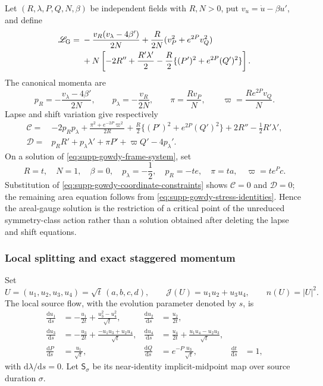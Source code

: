 \documentclass[11pt]{article}
\numberwithin{equation}{section}
\theoremstyle{definition}
\theoremstyle{remark}
\newcommand{\dd}{\mathrm d}
\begin{document}
Let $(R,\lambda,P,Q,N,\beta)$ be independent fields with $R,N>0$, put
$v_u=\dot u-\beta u'$, and define
\begin{align}
 \mathscr L_{\rm G}={}&
 -\frac{v_R(v_\lambda-4\beta')}{2N}
 +\frac R{2N}(v_P^2+e^{2P}v_Q^2)\nonumber\\
 &+N\left[-2R''+\frac{R'\lambda'}2
 -\frac R2\{(P')^2+e^{2P}(Q')^2\}\right].
 \label{eq:supp-gowdy-adm-density}
\end{align}
The canonical momenta are
\begin{equation}
 p_R=-\frac{v_\lambda-4\beta'}{2N},\qquad
 p_\lambda=-\frac{v_R}{2N},\qquad
 \pi=\frac{Rv_P}{N},\qquad
 \varpi=\frac{Re^{2P}v_Q}{N}.
 \label{eq:supp-gowdy-momenta}
\end{equation}
Lapse and shift variation give respectively
\begin{align}
 \mathcal C={}&-2p_Rp_\lambda
 +\frac{\pi^2+e^{-2P}\varpi^2}{2R}
 +\frac R2\{(P')^2+e^{2P}(Q')^2\}
 +2R''-\frac12R'\lambda',\label{eq:supp-gowdy-H}\\
 \mathcal D={}&p_RR'+p_\lambda\lambda'+\pi P'+\varpi Q'-4p_\lambda'.
 \label{eq:supp-gowdy-D}
\end{align}
On a solution of \eqref{eq:supp-gowdy-frame-system}, set
\begin{equation}
 R=t,\quad N=1,\quad\beta=0,\quad
 p_\lambda=-\frac12,\quad p_R=-te,\quad
 \pi=ta,\quad\varpi=te^Pc.
 \label{eq:supp-gowdy-areal-lift}
\end{equation}
Substitution of \eqref{eq:supp-gowdy-coordinate-constraints} shows
$\mathcal C=0$ and $\mathcal D=0$; the remaining area equation follows from
\eqref{eq:supp-gowdy-stress-identities}.  Hence the areal-gauge solution is the
restriction of a critical point of the unreduced symmetry-class action rather
than a solution obtained after deleting the lapse and shift equations.

\subsubsection{Local splitting and exact staggered momentum}

Set
\begin{equation}
 U=(u_1,u_2,u_3,u_4)=\sqrt t\,(a,b,c,d),\qquad
 \mathcal J(U)=u_1u_2+u_3u_4,
 \qquad n(U)=|U|^2.
 \label{eq:supp-gowdy-rescaled-frame}
\end{equation}
The local source flow, with the evolution parameter denoted by $s$, is
\begin{align}
 \frac{\dd u_1}{\dd s}&=-\frac{u_1}{2t}
 +\frac{u_3^2-u_4^2}{\sqrt t},&
 \frac{\dd u_2}{\dd s}&=\frac{u_2}{2t},\nonumber\\
 \frac{\dd u_3}{\dd s}&=-\frac{u_3}{2t}
 +\frac{-u_1u_3+u_2u_4}{\sqrt t},&
 \frac{\dd u_4}{\dd s}&=\frac{u_4}{2t}
 +\frac{u_1u_4-u_2u_3}{\sqrt t},\nonumber\\
 \frac{\dd P}{\dd s}&=\frac{u_1}{\sqrt t},&
 \frac{\dd Q}{\dd s}&=e^{-P}\frac{u_3}{\sqrt t},&
 \frac{\dd t}{\dd s}&=1,
 \label{eq:supp-gowdy-source-flow}
\end{align}
with $\dd\lambda/\dd s=0$.  Let $\mathsf S_\sigma$ be its near-identity
implicit-midpoint map over source duration $\sigma$.
\end{document}
